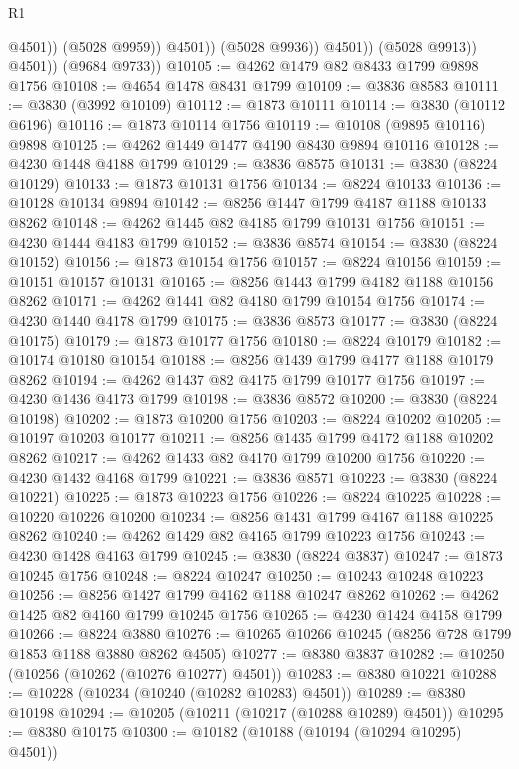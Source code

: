 \begin{lexlean}{R1}
\begin{coremodule}
                            @4501))
                        (@5028 @9959))
                      @4501))
                  (@5028 @9936))
                @4501))
            (@5028 @9913))
          @4501))
      (@9684 @9733))
@10105 := @4262 @1479 @82 @8433 @1799 @9898 @1756
@10108 := @4654 @1478 @8431 @1799
@10109 := @3836 @8583
@10111 := @3830 (@3992 @10109)
@10112 := @1873 @10111
@10114 := @3830 (@10112 @6196)
@10116 := @1873 @10114 @1756
@10119 := @10108 (@9895 @10116) @9898
@10125 := @4262 @1449 @1477 @4190 @8430 @9894 @10116
@10128 := @4230 @1448 @4188 @1799
@10129 := @3836 @8575
@10131 := @3830 (@8224 @10129)
@10133 := @1873 @10131 @1756
@10134 := @8224 @10133
@10136 := @10128 @10134 @9894
@10142 := @8256 @1447 @1799 @4187 @1188 @10133 @8262
@10148 := @4262 @1445 @82 @4185 @1799 @10131 @1756
@10151 := @4230 @1444 @4183 @1799
@10152 := @3836 @8574
@10154 := @3830 (@8224 @10152)
@10156 := @1873 @10154 @1756
@10157 := @8224 @10156
@10159 := @10151 @10157 @10131
@10165 := @8256 @1443 @1799 @4182 @1188 @10156 @8262
@10171 := @4262 @1441 @82 @4180 @1799 @10154 @1756
@10174 := @4230 @1440 @4178 @1799
@10175 := @3836 @8573
@10177 := @3830 (@8224 @10175)
@10179 := @1873 @10177 @1756
@10180 := @8224 @10179
@10182 := @10174 @10180 @10154
@10188 := @8256 @1439 @1799 @4177 @1188 @10179 @8262
@10194 := @4262 @1437 @82 @4175 @1799 @10177 @1756
@10197 := @4230 @1436 @4173 @1799
@10198 := @3836 @8572
@10200 := @3830 (@8224 @10198)
@10202 := @1873 @10200 @1756
@10203 := @8224 @10202
@10205 := @10197 @10203 @10177
@10211 := @8256 @1435 @1799 @4172 @1188 @10202 @8262
@10217 := @4262 @1433 @82 @4170 @1799 @10200 @1756
@10220 := @4230 @1432 @4168 @1799
@10221 := @3836 @8571
@10223 := @3830 (@8224 @10221)
@10225 := @1873 @10223 @1756
@10226 := @8224 @10225
@10228 := @10220 @10226 @10200
@10234 := @8256 @1431 @1799 @4167 @1188 @10225 @8262
@10240 := @4262 @1429 @82 @4165 @1799 @10223 @1756
@10243 := @4230 @1428 @4163 @1799
@10245 := @3830 (@8224 @3837)
@10247 := @1873 @10245 @1756
@10248 := @8224 @10247
@10250 := @10243 @10248 @10223
@10256 := @8256 @1427 @1799 @4162 @1188 @10247 @8262
@10262 := @4262 @1425 @82 @4160 @1799 @10245 @1756
@10265 := @4230 @1424 @4158 @1799
@10266 := @8224 @3880
@10276 := @10265 @10266 @10245 (@8256 @728 @1799 @1853 @1188 @3880 @8262 @4505)
@10277 := @8380 @3837
@10282 := @10250 (@10256 (@10262 (@10276 @10277) @4501))
@10283 := @8380 @10221
@10288 := @10228 (@10234 (@10240 (@10282 @10283) @4501))
@10289 := @8380 @10198
@10294 := @10205 (@10211 (@10217 (@10288 @10289) @4501))
@10295 := @8380 @10175
@10300 := @10182 (@10188 (@10194 (@10294 @10295) @4501))

\end{coremodule}
\end{lexlean}
